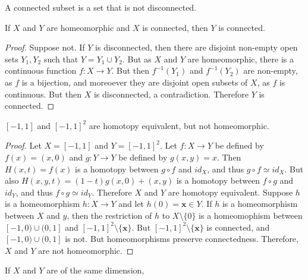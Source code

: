 \documentclass[crop=false,class=article,oneside]{standalone}
\begin{document}
        \begin{definition}
            A connected subset is a set that is not
            disconnected.
        \end{definition}
        \begin{theorem}
            If $X$ and $Y$ are homeomorphic and
            $X$ is connected, then $Y$ is connected.
        \end{theorem}
        \begin{proof}
            Suppose not. If $Y$ is disconnected, then
            there are disjoint non-empty open sets $Y_{1},Y_{2}$
            such that $Y=Y_{1}\cup{Y_{2}}$. But as $X$ and $Y$
            are homeomorphic, there is a continuous function
            $f:X\rightarrow{Y}$. But then
            $f^{-1}(Y_{1})$ and $f^{-1}(Y_{2})$ are
            non-empty, as $f$ is a bijection, and moreoever
            they are disjoint open subsets of $X$, as
            $f$ is continuous. But then $X$ is disconnected,
            a contradiction. Therefore $Y$ is connected.
        \end{proof}
        \begin{theorem}
            $[-1,1]$ and $[-1,1]^{2}$ are homotopy equivalent,
            but not homeomorphic.
        \end{theorem}
        \begin{proof}
            Let $X=[-1,1]$ and $Y=[-1,1]^{2}$.
            Let $f:X\rightarrow{Y}$ be defined by
            $f(x)=(x,0)$ and $g:Y\rightarrow{Y}$ be defined
            by $g(x,y)=x$.
            Then $H(x,t)=f(x)$ is a homotopy between
            $g\circ{f}$ and $id_{X}$, and thus
            $g\circ{f}\simeq{id_{X}}$. But also
            $H(x,y,t)=(1-t)g(x,0)+(x,y)$ is a homotopy
            between $f\circ{g}$ and $id_{Y}$, and thus
            $f\circ{g}\simeq{id_{Y}}$. Therefore $X$ and $Y$
            are homotopy equivalent. Suppose $h$ is a
            homeomorphism $h:X\rightarrow{Y}$ and let
            $h(0)=\mathbf{x}\in{Y}$. If $h$ is a homeomorphism
            between $X$ and $y$, then the restriction of
            $h$ to $X\setminus\{0\}$ is a homeomophism
            between $[-1,0)\cup(0,1]$ and
            $[-1,1]^{2}\setminus\{\mathbf{x}\}$. But
            $[-1,1]^{2}\setminus\{\mathbf{x}\}$ is connected,
            and $[-1,0)\cup(0,1]$ is not. But homeomorphisms
            preserve connectedness. Therefore, $X$ and
            $Y$ are not homeomorphic.
        \end{proof}
        If $X$ and $Y$ are of the same dimension,
\end{document}
